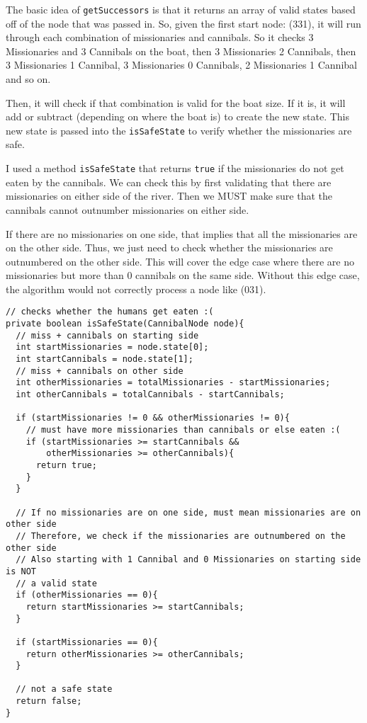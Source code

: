 \documentclass[a4paper]{report}
\begin{document}
The basic idea of \verb`getSuccessors` is that it returns an array of valid states
based off of the node that was passed in. So, given the first start node: (331), it will
run through each combination of missionaries and cannibals. So it checks 3 Missionaries and 
3 Cannibals on the boat, then 3 Missionaries 2 Cannibals, then 3 Missionaries 1 Cannibal, 
3 Missionaries 0 Cannibals, 2 Missionaries 1 Cannibal and so on. 

Then, it will check if 
that combination is valid for the boat size. If it is, it will add or subtract (depending
on where the boat is) to create the new state. This new state is passed into the \verb`isSafeState`
to verify whether the missionaries are safe. 

I used a method \verb`isSafeState` that returns \verb`true` if the missionaries do not get
eaten by the cannibals. We can check this by first validating that there are missionaries on
either side of the river. Then we MUST make sure that the cannibals cannot outnumber
missionaries on either side. 

If there are no missionaries on one side, that implies that all the missionaries are on the 
other side. Thus, we just need to check whether the missionaries are outnumbered on the other side. 
This will cover the edge case where there are no missionaries but more than 0 cannibals on the same side. 
Without this edge case, the algorithm would not correctly process a node like (031).

\begin{lstlisting}
// checks whether the humans get eaten :(
private boolean isSafeState(CannibalNode node){
  // miss + cannibals on starting side
  int startMissionaries = node.state[0];
  int startCannibals = node.state[1];
  // miss + cannibals on other side
  int otherMissionaries = totalMissionaries - startMissionaries;
  int otherCannibals = totalCannibals - startCannibals;
  
  if (startMissionaries != 0 && otherMissionaries != 0){
    // must have more missionaries than cannibals or else eaten :(
    if (startMissionaries >= startCannibals && 
        otherMissionaries >= otherCannibals){
      return true;
    }
  }
  
  // If no missionaries are on one side, must mean missionaries are on other side
  // Therefore, we check if the missionaries are outnumbered on the other side
  // Also starting with 1 Cannibal and 0 Missionaries on starting side is NOT 
  // a valid state
  if (otherMissionaries == 0){
    return startMissionaries >= startCannibals;
  }
  
  if (startMissionaries == 0){
    return otherMissionaries >= otherCannibals;
  }
  
  // not a safe state
  return false;
}

\end{lstlisting}
\end{document}
